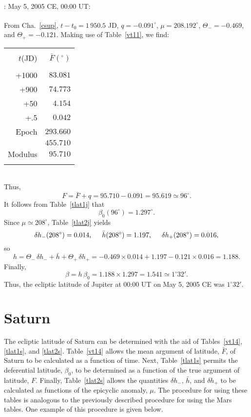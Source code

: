 ~\\
: May 5, 2005 CE, 00:00 UT:\\
~\\
From Cha.~\ref{csup}, $t-t_0=1\,950.5$ JD, 
$q= -0.091^\circ$,  $\mu= 208.192^\circ$, $\Theta_-=-0.469$, and
$\Theta_+ = -0.121$.
 Making use of
Table~\ref{vt11}, we find:\\
\begin{tabular}{rr}
&\\
$t$(JD) & $\bar{F}(^\circ)$\\[-2ex]
&\\
+1000 & $83.081$ \\
+900 & $74.773$\\
+50 & $4.154$ \\
+.5 & $0.042$\\
Epoch & $293.660$ \\\cline{2-2}
&$455.710$ \\\cline{2-2}
Modulus & $95.710$ \\ 
&\\
\end{tabular}\\
Thus,
$$
F = \bar{F} + q =95.710-0.091 = 95.619\simeq 96^\circ.
$$
It follows from Table~\ref{tlat1j} that
$$
\beta_0(96^\circ) = 1.297^\circ.
$$
Since $\mu\simeq 208^\circ$, Table~\ref{tlat2j} yields
$$
\delta h_-(208^\circ) = 0.014,\mbox{\hspace{0.5cm}}\bar{h}(208^\circ)=1.197, \mbox{\hspace{0.5cm}}\delta h_+(208^\circ) = 0.016,
$$
so
$$
h = \Theta_-\,\delta h_- + \bar{h}+\Theta_+\,\delta h_+ = -0.469\times 0.014 +1.197-0.121\times 0.016 = 1.188.
$$
Finally,
$$
\beta = h\,\beta_0 = 1.188\times 1.297 = 1.541 \simeq 1^\circ 32'.
$$
Thus,
the ecliptic latitude of Jupiter at 00:00 UT on May 5, 2005 CE was $1^\circ 32'$.

\section{Saturn}
The ecliptic latitude of Saturn can be determined with the aid of Tables~\ref{vt14}, \ref{tlat1s}, and \ref{tlat2s}. Table~\ref{vt14} allows
the mean argument of latitude, $\bar{F}$, of Saturn to be calculated as a function of
time. Next, Table~\ref{tlat1s} permits the deferential latitude, $\beta_0$, to
be determined as a function of the true argument of latitude, $F$. Finally, Table~\ref{tlat2s} allows the quantities
$\delta h_-$, $\bar{h}$, and $\delta h_+$ to be calculated as functions of the epicyclic
anomaly, $\mu$.  The procedure for using these tables is analogous to the previously described procedure for
using the Mars tables.
One example of this procedure is given below.

